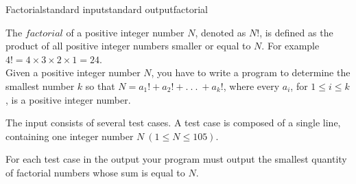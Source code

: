 \begin{problem}{Factorial}{standard input}{standard output}{factorial}

The $factorial$ of a positive integer number $N$, denoted as $N!$, is defined as the product of all
positive integer numbers smaller or equal to $N$. For example $4! = 4 \times 3 \times 2 \times 1 =
24$.\\
Given a positive integer number $N$, you have to write a program to determine the smallest number
$k$ so that $N = a_1! + a_2! + .\ .\ .\ + a_k!$, where every $a_i$, for $1 \leq i \leq k$, is a
positive integer number.

\InputFile

The input consists of several test cases. A test case is composed of a single line, containing one
integer number $N\ (1 \leq N \leq 105)$.\\

\OutputFile

For each test case in the output your program must output the smallest quantity of factorial numbers
whose sum is equal to $N$.\\

\Example

\begin{example}
%
\end{example}

\end{problem}
